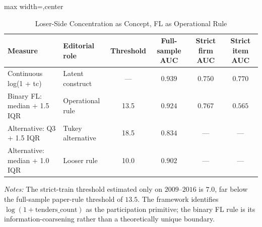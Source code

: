 \begin{table}[htbp]
\centering
\caption{Loser-Side Concentration as Concept, FL as Operational Rule}
\label{tab:theory_operationalization}
\footnotesize
\begin{adjustbox}{max width=\textwidth,center}
\begin{tabular}{p{3.5cm}p{2.6cm}cccc}
\toprule
Measure & Editorial role & Threshold & Full-sample AUC & Strict firm AUC & Strict item AUC \\
\midrule
Continuous log(1 + tc) & Latent construct & --- & $0.939$ & $0.750$ & $0.770$ \\
Binary FL: median + 1.5 IQR & Operational rule & 13.5 & $0.924$ & $0.767$ & $0.565$ \\
Alternative: Q3 + 1.5 IQR & Tukey alternative & 18.5 & $0.834$ & --- & --- \\
Alternative: median + 1.0 IQR & Looser rule & 10.0 & $0.902$ & --- & --- \\
\bottomrule
\end{tabular}
\end{adjustbox}

\smallskip
{\footnotesize\textit{Notes:} The strict-train threshold estimated
only on $2009$--$2016$ is $7.0$, far below the full-sample
paper-rule threshold of $13.5$. The framework identifies
$\log(1+\text{tenders\_count})$ as the participation primitive; the
binary FL rule is its information-coarsening rather than a
theoretically unique boundary.\par}
\end{table}
